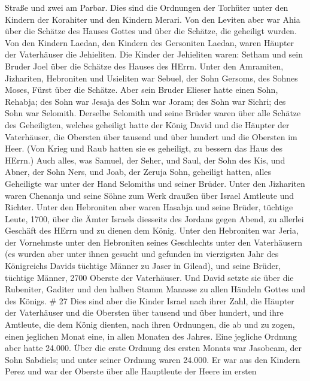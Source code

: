 Straße und zwei am Parbar.  Dies sind die Ordnungen der
Torhüter unter den Kindern der Korahiter und den Kindern Merari.
 Von den Leviten aber war Ahia über die Schätze des Hauses
Gottes und über die Schätze, die geheiligt wurden.  Von den
Kindern Laedan, den Kindern des Gersoniten Laedan, waren Häupter der
Vaterhäuser die Jehieliten.  Die Kinder der Jehieliten
waren: Setham und sein Bruder Joel über die Schätze des Hauses des
HErrn.  Unter den Amramiten, Jizhariten, Hebroniten und
Usieliten  war Sebuel, der Sohn Gersoms, des Sohnes Moses,
Fürst über die Schätze.  Aber sein Bruder Elieser hatte
einen Sohn, Rehabja; des Sohn war Jesaja des Sohn war Joram; des Sohn
war Sichri; des Sohn war Selomith.  Derselbe Selomith und
seine Brüder waren über alle Schätze des Geheiligten, welches geheiligt
hatte der König David und die Häupter der Vaterhäuser, die Obersten über
tausend und über hundert und die Obersten im Heer.  (Von
Krieg und Raub hatten sie es geheiligt, zu bessern das Haus des HErrn.)
 Auch alles, was Samuel, der Seher, und Saul, der Sohn des
Kis, und Abner, der Sohn Ners, und Joab, der Zeruja Sohn, geheiligt
hatten, alles Geheiligte war unter der Hand Selomiths und seiner Brüder.
 Unter den Jizhariten waren Chenanja und seine Söhne zum
Werk draußen über Israel Amtleute und Richter.  Unter den
Hebroniten aber waren Hasabja und seine Brüder, tüchtige Leute, 1700,
über die Ämter Israels diesseits des Jordans gegen Abend, zu allerlei
Geschäft des HErrn und zu dienen dem König.  Unter den
Hebroniten war Jeria, der Vornehmste unter den Hebroniten seines
Geschlechts unter den Vaterhäusern (es wurden aber unter ihnen gesucht
und gefunden im vierzigsten Jahr des Königreichs Davids tüchtige Männer
zu Jaser in Gilead),  und seine Brüder, tüchtige Männer,
2700 Oberste der Vaterhäuser. Und David setzte sie über die Rubeniter,
Gaditer und den halben Stamm Manasse zu allen Händeln Gottes und des
Königs. \# 27  Dies sind aber die Kinder Israel nach ihrer
Zahl, die Häupter der Vaterhäuser und die Obersten über tausend und über
hundert, und ihre Amtleute, die dem König dienten, nach ihren Ordnungen,
die ab und zu zogen, einen jeglichen Monat eine, in allen Monaten des
Jahres. Eine jegliche Ordnung aber hatte 24.000.  Über die
erste Ordnung des ersten Monats war Jasobeam, der Sohn Sabdiels; und
unter seiner Ordnung waren 24.000.  Er war aus den Kindern
Perez und war der Oberste über alle Hauptleute der Heere im ersten
